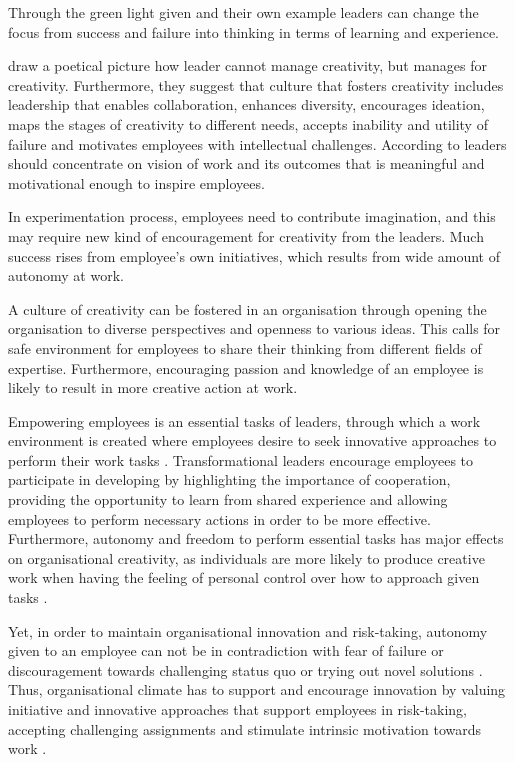Through the green light given and their own example leaders can change the focus from success and failure into thinking in terms of learning and experience. \citep{farson2002failuretolerantleader}

\citet{amabile2008creativity} draw a poetical picture how leader cannot manage creativity, but manages for creativity. Furthermore, they suggest that culture that fosters creativity includes leadership that enables collaboration, enhances diversity, encourages ideation, maps the stages of creativity to different needs, accepts inability and utility of failure and motivates employees with intellectual challenges. According to \citet{sosik1999leadership} leaders should concentrate on vision of work and its outcomes that is meaningful and motivational enough to inspire employees. 

In experimentation process, employees need to contribute imagination, and this may require new kind of encouragement for creativity from the leaders. Much success rises from employee's own initiatives, which results from wide amount of autonomy at work. \citep{amabile2008creativity}

A culture of creativity can be fostered in an organisation through opening the organisation to diverse perspectives and openness to various ideas. This calls for safe environment for employees to share their thinking from different fields of expertise. Furthermore, encouraging passion and knowledge of an employee is likely to result in more creative action at work. \citep{amabile2008creativity}

Empowering employees is an essential tasks of leaders, through which a work environment is created where employees desire to seek innovative approaches to perform their work tasks \citep{jung2003role}. Transformational leaders encourage employees to participate in developing by highlighting the importance of cooperation, providing the opportunity to learn from shared experience and allowing employees to perform necessary actions in order to be more effective\citep{bass1990implications}. Furthermore, autonomy and freedom to perform essential tasks has major effects on organisational creativity, as individuals are more likely to produce creative work when having the feeling of personal control over how to approach given tasks \citep{amabile1996assessing}.

Yet, in order to maintain organisational innovation and risk-taking, autonomy given to an employee can not be in contradiction with fear of failure or discouragement towards challenging status quo or trying out novel solutions \citep{yukl2002leadership}. Thus, organisational climate has to support and encourage innovation \citep{mumford1988creativity} by valuing initiative and innovative approaches that support employees in risk-taking, accepting challenging assignments and stimulate intrinsic motivation towards work \citep{jung2003role}.

